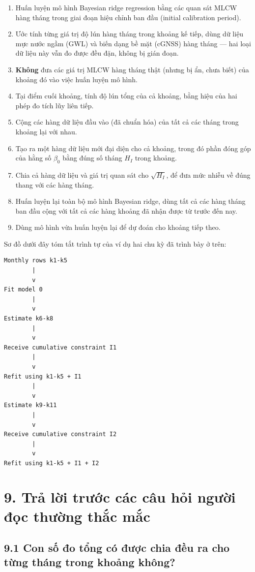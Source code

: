 \documentclass[12pt]{article}
\begin{document}
\begin{enumerate}
\item Huấn luyện mô hình Bayesian ridge regression bằng các quan sát MLCW hàng tháng trong giai đoạn hiệu chỉnh ban đầu (initial calibration period).
\item Ước tính từng giá trị độ lún hàng tháng trong khoảng kế tiếp, dùng dữ liệu mực nước ngầm (GWL) và biến dạng bề mặt (cGNSS) hàng tháng — hai loại dữ liệu này vẫn đo được đều đặn, không bị gián đoạn.
\item \textbf{Không} đưa các giá trị MLCW hàng tháng thật (nhưng bị ẩn, chưa biết) của khoảng đó vào việc huấn luyện mô hình.
\item Tại điểm cuối khoảng, tính độ lún tổng của cả khoảng, bằng hiệu của hai phép đo tích lũy liên tiếp.
\item Cộng các hàng dữ liệu đầu vào (đã chuẩn hóa) của tất cả các tháng trong khoảng lại với nhau.
\item Tạo ra một hàng dữ liệu mới đại diện cho cả khoảng, trong đó phần đóng góp của hằng số $\beta_0$ bằng đúng số tháng $H_I$ trong khoảng.
\item Chia cả hàng dữ liệu và giá trị quan sát cho $\sqrt{H_I}$, để đưa mức nhiễu về đúng thang với các hàng tháng.
\item Huấn luyện lại toàn bộ mô hình Bayesian ridge, dùng tất cả các hàng tháng ban đầu cộng với tất cả các hàng khoảng đã nhận được từ trước đến nay.
\item Dùng mô hình vừa huấn luyện lại để dự đoán cho khoảng tiếp theo.
\end{enumerate}

Sơ đồ dưới đây tóm tắt trình tự của ví dụ hai chu kỳ đã trình bày ở trên:

\begin{lstlisting}
Monthly rows k1-k5
        |
        v
Fit model 0
        |
        v
Estimate k6-k8
        |
        v
Receive cumulative constraint I1
        |
        v
Refit using k1-k5 + I1
        |
        v
Estimate k9-k11
        |
        v
Receive cumulative constraint I2
        |
        v
Refit using k1-k5 + I1 + I2
\end{lstlisting}

\section{9. Trả lời trước các câu hỏi người đọc thường thắc mắc}

\subsection{9.1 Con số đo tổng có được chia đều ra cho từng tháng trong khoảng không?}
\end{document}

